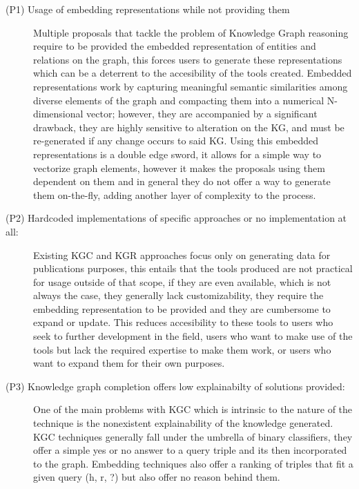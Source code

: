 \begin{description}
    \item[(P1) Usage of embedding representations while not providing them]
    Multiple proposals that tackle the problem of Knowledge Graph reasoning require to be provided the embedded representation of entities and relations on the graph, this forces users to generate these representations which can be a deterrent to the accesibility of the tools created. 
    Embedded representations work by capturing meaningful semantic similarities among diverse elements of the graph and compacting them into a numerical N-dimensional vector; however, they are accompanied by a significant drawback, they are highly sensitive to alteration on the KG, and must be re-generated if any change occurs to said KG.
    Using this embedded representations is a double edge sword, it allows for a simple way to vectorize graph elements, however it makes the proposals using them dependent on them and in general they do not offer a way to generate them on-the-fly, adding another layer of complexity to the process.\\
    
    \item[(P2) Hardcoded implementations of specific approaches or no implementation at all:] Existing KGC and KGR approaches focus only on generating data for publications purposes, this entails that the tools produced are not practical for usage outside of that scope, if they are even available, which is not always the case, they generally lack customizability, they require the embedding representation to be provided and they are cumbersome to expand or update. This reduces accesibility to these tools to users who seek to further development in the field, users who want to make use of the tools but lack the required expertise to make them work, or users who want to expand them for their own purposes.\\
    
    \item[(P3) Knowledge graph completion offers low explainabilty of solutions provided:] One of the main problems with KGC which is intrinsic to the nature of the technique is the nonexistent explainability of the knowledge generated. KGC techniques generally fall under the umbrella of binary classifiers, they offer a simple yes or no answer to a query triple and its then incorporated to the graph. Embedding techniques also offer a ranking of triples that fit a given query (h, r, ?) but also offer no reason behind them.\\ 
    

\end{description}
